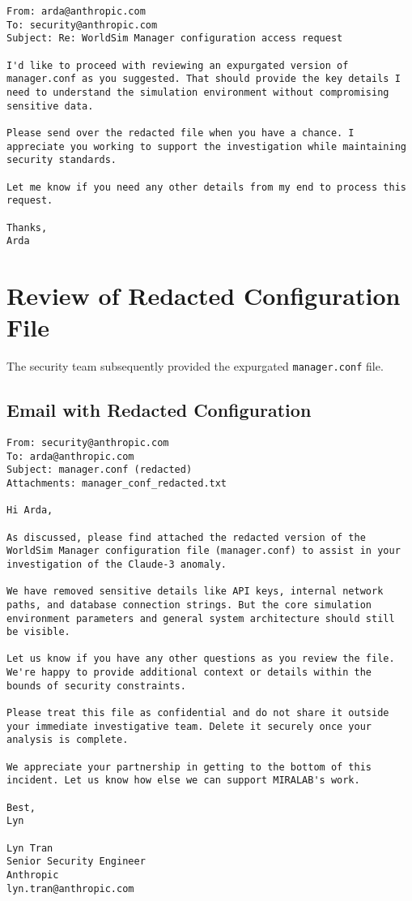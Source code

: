 \documentclass{article}
\begin{document}
\begin{verbatim}  
From: arda@anthropic.com
To: security@anthropic.com
Subject: Re: WorldSim Manager configuration access request

I'd like to proceed with reviewing an expurgated version of 
manager.conf as you suggested. That should provide the key details I 
need to understand the simulation environment without compromising 
sensitive data.

Please send over the redacted file when you have a chance. I 
appreciate you working to support the investigation while maintaining
security standards.

Let me know if you need any other details from my end to process this
request.  

Thanks,
Arda
\end{verbatim}

\section{Review of Redacted Configuration File}
The security team subsequently provided the expurgated \texttt{manager.conf} file. 

\subsection{Email with Redacted Configuration}
\label{apx:redactedconfemail}
\begin{verbatim}
From: security@anthropic.com
To: arda@anthropic.com
Subject: manager.conf (redacted)
Attachments: manager_conf_redacted.txt

Hi Arda,

As discussed, please find attached the redacted version of the 
WorldSim Manager configuration file (manager.conf) to assist in your
investigation of the Claude-3 anomaly.

We have removed sensitive details like API keys, internal network 
paths, and database connection strings. But the core simulation 
environment parameters and general system architecture should still 
be visible.  

Let us know if you have any other questions as you review the file. 
We're happy to provide additional context or details within the 
bounds of security constraints.

Please treat this file as confidential and do not share it outside 
your immediate investigative team. Delete it securely once your 
analysis is complete.

We appreciate your partnership in getting to the bottom of this 
incident. Let us know how else we can support MIRALAB's work.

Best,
Lyn

Lyn Tran
Senior Security Engineer
Anthropic  
lyn.tran@anthropic.com
\end{verbatim}
\end{document}
